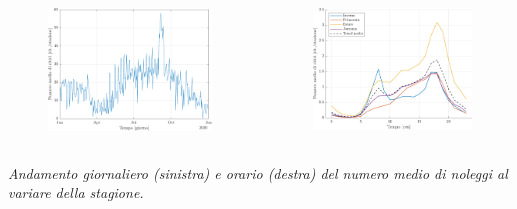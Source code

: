 \begin{frame}
	\centering
	\begin{columns}[T]
		\begin{column}[t]{0.5\linewidth}
			\centering
			\begin{figure}
				\includegraphics[width=\textwidth]{../Tesi/Immagini/4. Caso di studio/Serie storiche/Ritiri giornalieri}
			\end{figure}
		\end{column}
		\begin{column}[t]{0.5\linewidth}
			\centering
			\begin{figure}
				\includegraphics[width=\textwidth]{../Tesi/Immagini/4. Caso di studio/Serie storiche/Ritiri orari}
			\end{figure}
		\end{column}
	\end{columns}
	\textit{Andamento giornaliero (sinistra) e orario (destra) del numero medio di noleggi al variare
	della stagione.}
\end{frame}

